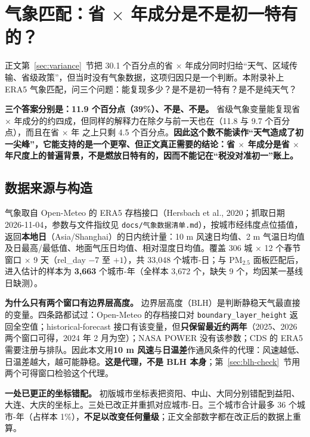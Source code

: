 \section{气象匹配：省 $\times$ 年成分是不是初一特有的？}\label{app:weather}

正文第~\ref{sec:variance}~节把 30.1 个百分点的省 $\times$ 年成分同时归给“天气、区域传输、省级政策”，但当时没有气象数据，这项归因只是一个判断。本附录补上 ERA5 气象匹配，问三个问题：能复现多少？是不是初一特有？是不是纯天气？

\textbf{三个答案分别是：11.9 个百分点（39\%）、不是、不是。} 省级气象变量能复现省 $\times$ 年成分的约四成，但同样的解释力在除夕与前一天也在（11.8 与 9.7 个百分点），而且在省 $\times$ 年 \NOtwo{} 之上只剩 4.5 个百分点。\textbf{因此这个数不能读作“天气造成了初一尖峰”，它能支持的是一个更窄、但正文真正需要的结论：省 $\times$ 年成分是省 $\times$ 年尺度上的普遍背景，不是燃放日特有的，因而不能记在“税没对准初一”账上。}

\subsection{数据来源与构造}

气象取自 Open-Meteo 的 ERA5 存档接口（Hersbach et al., 2020；抓取日期 2026-11-04，参数与文件指纹见 \texttt{docs/气象数据清单.md}），按城市经纬度点位插值，返回\textbf{本地日}（Asia/Shanghai）的日内统计量：10 m 风速日均值、2 m 气温日均值及日最高/最低值、地面气压日均值、相对湿度日均值。覆盖 306 城 $\times$ 12 个春节窗口 $\times$ 9 天（rel\_day $-7$ 至 $+1$），共 33{,}048 个城市-日；与 PM$_{2.5}$ 面板匹配后，进入估计的样本为 \textbf{3{,}663} 个城市-年（全样本 3{,}672 个，缺失 9 个，均因某一基线日缺测）。

\textbf{为什么只有两个窗口有边界层高度。} 边界层高度（BLH）是判断静稳天气最直接的变量。四条路都试过：Open-Meteo 的存档接口对 \texttt{boundary\_layer\_height} 返回全空值；historical-forecast 接口有该变量，但\textbf{只保留最近约两年}（2025、2026 两个窗口可得，2024 年 2 月为空）；NASA POWER 没有该参数；CDS 的 ERA5 需要注册与排队。因此本文用\textbf{10 m 风速}与\textbf{日温差}作通风条件的代理：风速越低、日温差越大，越可能静稳。\textbf{这是代理，不是 BLH 本身}；第~\ref{sec:blh-check}~节用两个可得窗口检验这个代理。

\textbf{一处已更正的坐标错配。} 初版城市坐标表把资阳、中山、大同分别错配到益阳、大连、大庆的坐标上。三处已改正并重抓对应城市-日。三个城市合计最多 36 个城市-年（占样本 1\%），\textbf{不足以改变任何量级}；正文全部数字都在改正后的数据上重算。

